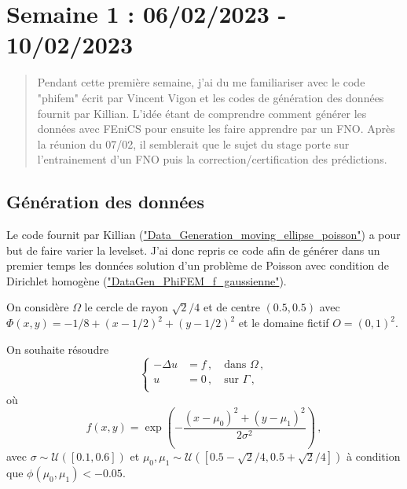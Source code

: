 \section{Semaine 1 : 06/02/2023 - 10/02/2023}
\graphicspath{{semaines/semaine_1/images/}}

\begin{abstract}
	Pendant cette première semaine, j'ai du me familiariser avec le code "phifem" écrit par Vincent Vigon et les codes de génération des données fournit par Killian. L'idée étant de comprendre comment générer les données avec FEniCS pour ensuite les faire apprendre par un FNO. Après la réunion du 07/02, il semblerait que le sujet du stage porte sur l'entrainement d'un FNO puis la correction/certification des prédictions.
\end{abstract}

\subsection{Génération des données}

Le code fournit par Killian (\href{https://colab.research.google.com/drive/1AJr5JaNs_gnbJce7zE2rfbjicwPxjdtL}{"Data\_Generation\_moving\_ellipse\_poisson"}) a pour but de faire varier la levelset. J'ai donc repris ce code afin de générer dans un premier temps les données solution d'un problème de Poisson avec condition de Dirichlet homogène (\href{https://colab.research.google.com/drive/1dHHFmfDs9XiMoT5EMKXQ1OFFKB3138c2}{"DataGen\_PhiFEM\_f\_gaussienne"}). 

On considère $\Omega$ le cercle de rayon $\sqrt{2}/4$ et de centre $(0.5,0.5)$ avec $\Phi(x,y)=-1/8+(x-1/2)^2+(y-1/2)^2$ et le domaine fictif $O=(0,1)^2$.

On souhaite résoudre 
\begin{equation*}
	\begin{cases}
		-\Delta u &= f\,, \quad \text{dans $\Omega$}\,, \\
		u &= 0\,, \quad \text{sur $\Gamma$}\,, \\
	\end{cases}
\end{equation*}
où 
$$f(x,y) = \exp\left(-\frac{(x-\mu_0)^2 + (y-\mu_1)^2}{2\sigma^2}\right)\,, $$ 
avec $\sigma \sim \mathcal{U}([0.1,0.6])$ et $\mu_0, \mu_1 \sim \mathcal{U}([0.5-\sqrt{2}/4, 0.5+\sqrt{2}/4])$ à condition que $\phi(\mu_0, \mu_1) < -0.05$. 

